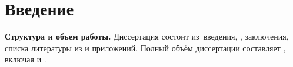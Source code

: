 \chapter*{Введение}                         %

\newcommand{\actuality}{\textbf\actualityTXT}
\newcommand{\progress}{\textbf\progressTXT}
\newcommand{\aim}{\textbf\aimTXT}
\newcommand{\tasks}{\textbf{\tasksTXT}}
\newcommand{\researchObject}{\textbf{\researchObjectTXT}}
\newcommand{\researchSubject}{\textbf{\researchSubjectTXT}}
\newcommand{\novelty}{\textbf{\noveltyTXT}}
\newcommand{\influence}{\textbf{\influenceTXT}}
\newcommand{\methods}{\textbf{\methodsTXT}}
\newcommand{\defpositions}{\textbf{\defpositionsTXT}}
\newcommand{\theoreticalValue}{\textbf{\theoreticalValueTXT}}
\newcommand{\practicalValue}{\textbf{\practicalValueTXT}}
\newcommand{\specialityRelation}{\textbf{\specialityRelationTXT}}
\newcommand{\reliability}{\textbf{\reliabilityTXT}}
\newcommand{\probation}{\textbf{\probationTXT}}
\newcommand{\contribution}{\textbf{\contributionTXT}}
\newcommand{\publications}{\textbf{\publicationsTXT}}


\textbf{Структура и объем работы.} Диссертация состоит из~введения,
,
заключения, списка литературы из  и приложений.
%
Полный объём диссертации составляет
, включая
 и
.
